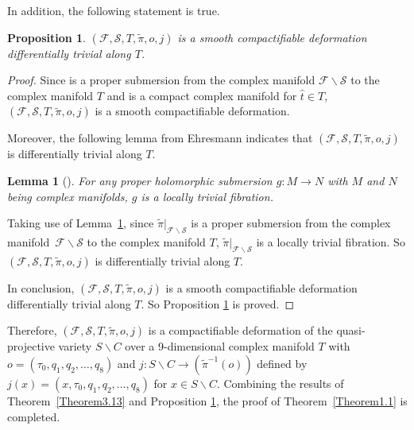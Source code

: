 \documentclass[10pt,a4paper]{amsart}
\numberwithin{equation}{section}
\newtheorem{Lemma}[Theorem]{Lemma}
\newtheorem{Proposition}[Theorem]{Proposition}
 { \theoremstyle{definition}
\newtheorem{Definition}[Theorem]{Definition}
\newtheorem{Note}[Theorem]{Note}
\newtheorem{Example}[Theorem]{Example}
\newtheorem{Remark}[Theorem]{Remark} }
\def\operatorname#1{#1}
\def\overline#1{#1}
\begin{document}
In addition, the following statement is true.

\begin{Proposition} \label{Proposition3.14}
$(\mathcal{F},\mathcal{S},T,\widetilde{\pi},o,j)$ is a smooth compactifiable deformation differentially trivial along $T$.
\end{Proposition}

\begin{proof}
Since  is a proper submersion from the complex manifold $\mathcal{F}\backslash \mathcal{S}$ to the complex manifold $T$ and \smash{$(\widetilde{\pi})^{-1}\bigl(\hat{t}\bigr)\cong \operatorname{CP}^2 \#9\overline{\operatorname{CP}}^2$} is a compact complex manifold for $\hat{t} \in T$, $(\mathcal{F},\mathcal{S},T,\widetilde{\pi},o,j)$ is a smooth compactifiable deformation.

Moreover, the following lemma from Ehresmann indicates that $(\mathcal{F},\mathcal{S},T,\widetilde{\pi},o,j)$ is differentially trivial along $T$.

\begin{Lemma}[{\cite[Theorem~9.3]{Claire}}] \label{Lemma3.15}
 For any proper holomorphic submersion $g\colon M\rightarrow N$ with $M$ and $N$ being complex manifolds, $g$ is a locally trivial fibration.
\end{Lemma}

Taking use of Lemma~\ref{Lemma3.15}, since $\widetilde{\pi}|_{\mathcal{F}\backslash \mathcal{S}}$ is a proper submersion from the complex manifold~$\mathcal{F}\backslash \mathcal{S}$ to the complex manifold $T$, $\widetilde{\pi}|_{\mathcal{F}\backslash \mathcal{S}}$ is a locally trivial fibration. So $(\mathcal{F},\mathcal{S},T,\widetilde{\pi},o,j)$ is differentially trivial along $T$.

In conclusion, $(\mathcal{F},\mathcal{S},T,\widetilde{\pi},o,j)$ is a smooth compactifiable deformation differentially trivial along $T$. So Proposition \ref{Proposition3.14} is proved.
\end{proof}


Therefore, $(\mathcal{F},\mathcal{S},T,\widetilde{\pi},o,j)$ is a compactifiable deformation of the quasi-projective variety $S\backslash C$ over a 9-dimensional complex manifold $T$ with $o=(\tau_0,q_1,q_2,\dots ,q_8)$ and $j\colon S \backslash C \rightarrow (\widetilde{\pi}^{-1}(o))$ defined by $j(x)=(x,\tau_0,q_1,q_2,\dots ,q_8)$ for $x \in S\backslash C$. Combining the results of Theorem~\ref{Theorem3.13} and Proposition \ref{Proposition3.14}, the proof of Theorem~\ref{Theorem1.1} is completed.
\end{document}
